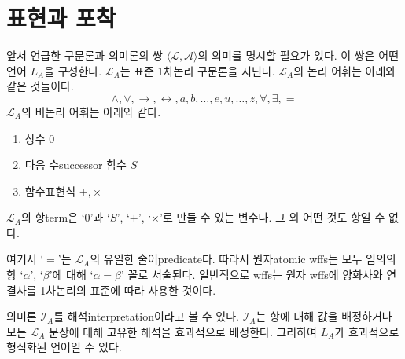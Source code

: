 \documentclass[a4paper,chapter,atbegshi]{oblivoir}
\begin{document}
\section{표현과 포착}
앞서 언급한 구문론과 의미론의 쌍 $\langle \mathcal{L},\mathcal{A}\rangle$의 
의미를 명시할 필요가 있다. 이 쌍은 어떤 언어 $L_A$을 구성한다. $\mathcal{L}_A$는
표준 1차논리 구문론을 지닌다. $\mathcal{L}_A$의 논리 어휘는 아래와 같은
것들이다.
\[
  \wedge, \vee, \rightarrow, \leftrightarrow, a, b, \ldots, e, u, \ldots, z,
  \forall, \exists, =
\]
$\mathcal{L}_A$의 비논리 어휘는 아래와 같다.
\begin{enumerate}
  \item 상수 $0$
  \item 다음 수{\tiny successor} 함수 $S$
  \item 함수표현식 $+, \times$
\end{enumerate}
$\mathcal{L}_A$의 항{\tiny term}은 `$0$'과 `$S$', `$+$', `$\times$'로 만들
수 있는 변수다. 그 외 어떤 것도 항일 수 없다. 

여기서 `$=$'는 $\mathcal{L}_A$의 유일한 술어{\tiny predicate}다. 따라서
원자{\tiny atomic} wffs는 모두 임의의 항 `$\alpha$', `$\beta$'에 대해 
`$\alpha = \beta$' 꼴로 서술된다. 일반적으로 wffs는 원자 wffs에 양화사와 
연결사를 1차논리의 표준에 따라 사용한 것이다. 

의미론 $\mathcal{I}_A$를 해석{\tiny interpretation}이라고 볼 수 있다.
$\mathcal{I}_A$는 항에 대해 값을 배정하거나 모든 $\mathcal{L}_A$ 문장에 대해
고유한 해석을 효과적으로 배정한다. 그리하여 $L_A$가 효과적으로 형식화된 언어일
수 있다.
\end{document}
